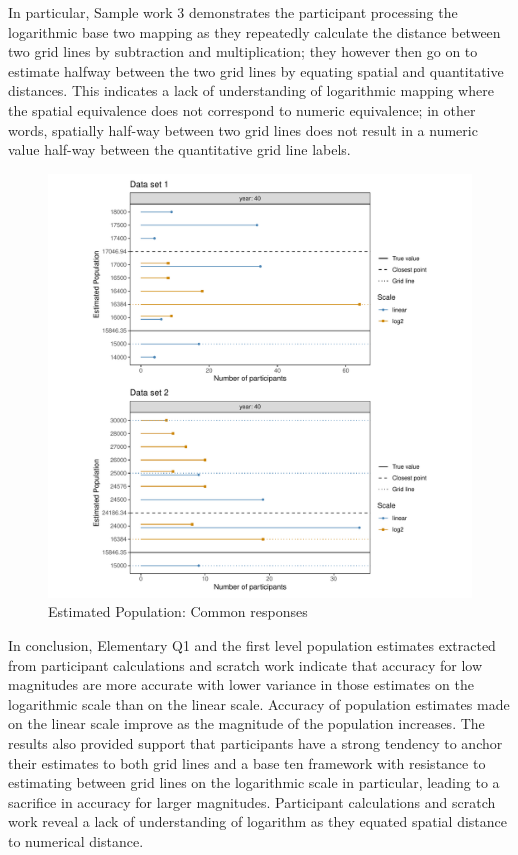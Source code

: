 \documentclass[print]{nuthesis}
\begin{document}
In particular, Sample work 3 demonstrates the participant processing the logarithmic base two mapping as they repeatedly calculate the distance between two grid lines by subtraction and multiplication; they however then go on to estimate halfway between the two grid lines by equating spatial and quantitative distances.
This indicates a lack of understanding of logarithmic mapping where the spatial equivalence does not correspond to numeric equivalence; in other words, spatially half-way between two grid lines does not result in a numeric value half-way between the quantitative grid line labels.

\begin{figure}[tbp]

{\centering \includegraphics[width=1\linewidth,]{thesis_files/figure-latex/common-population-estimates-1} 

}

\caption{Estimated Population: Common responses}\label{fig:common-population-estimates}
\end{figure}

In conclusion, Elementary Q1 and the first level population estimates extracted from participant calculations and scratch work indicate that accuracy for low magnitudes are more accurate with lower variance in those estimates on the logarithmic scale than on the linear scale.
Accuracy of population estimates made on the linear scale improve as the magnitude of the population increases.
The results also provided support that participants have a strong tendency to anchor their estimates to both grid lines and a base ten framework with resistance to estimating between grid lines on the logarithmic scale in particular, leading to a sacrifice in accuracy for larger magnitudes.
Participant calculations and scratch work reveal a lack of understanding of logarithm as they equated spatial distance to numerical distance.
\end{document}
